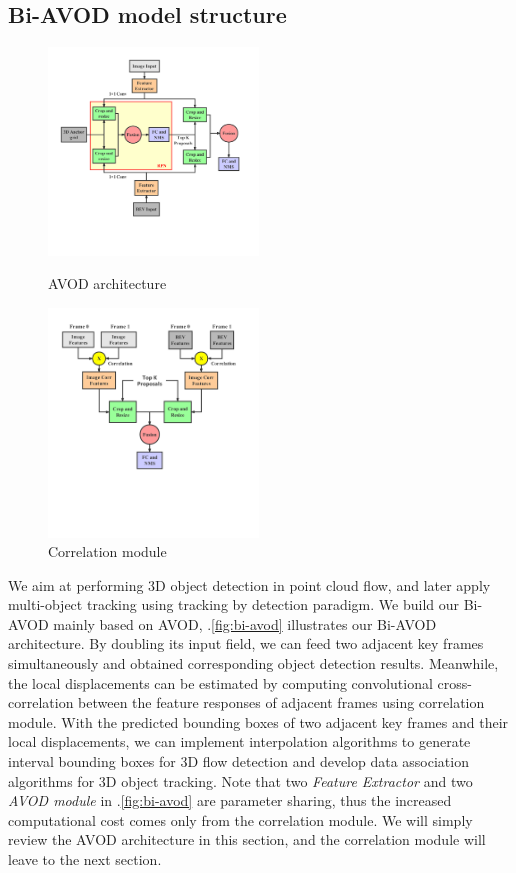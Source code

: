 \documentclass{bmvc2k}
\begin{document}
\subsection{Bi-AVOD model structure}

\begin{figure}
	\setlength{\abovecaptionskip}{-0.5cm}
	\begin{minipage}[t]{0.5\linewidth}
		\centering
		\includegraphics[width=2.2in]{images/AVOD}
		\caption{AVOD architecture}
		\label{fig:avod}
	\end{minipage}%
	\begin{minipage}[t]{0.5\linewidth}
		\centering
		\includegraphics[width=2.2in]{images/Correlation}
		\caption{Correlation module}
		\label{fig:correlation}
	\end{minipage}
\end{figure}

We aim at performing 3D object detection in point cloud flow, and later apply multi-object tracking using tracking by detection paradigm. We build our Bi-AVOD mainly based on AVOD\cite{ku2018joint}, \figurename .\ref{fig:bi-avod} illustrates our Bi-AVOD architecture. By doubling its input field, we can feed two adjacent key frames simultaneously and obtained corresponding object detection results. Meanwhile, the local displacements can be estimated by computing convolutional cross-correlation between the feature responses of adjacent frames using correlation module. With the predicted bounding boxes of two adjacent key frames and their local displacements, we can implement interpolation algorithms to generate interval bounding boxes for 3D flow detection and develop data association algorithms for 3D object tracking. Note that two \textit{Feature Extractor} and two \textit{AVOD module} in \figurename .\ref{fig:bi-avod} are parameter sharing, thus the increased computational cost comes only from the correlation module. We will simply review the AVOD architecture in this section, and the correlation module will leave to the next section.
\end{document}
